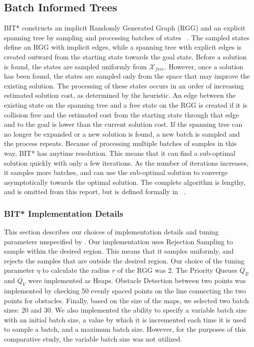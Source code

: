 \documentclass{article}
\begin{document}
\subsection{Batch Informed Trees}
BIT* constructs an implicit Randomly Generated Graph (RGG) and an explicit spanning tree by sampling and processing batches of states ~\cite{BIT*}. The sampled states define an RGG with implicit edges, while a spanning tree with explicit edges is created outward from the starting state towards the goal state. Before a solution is found, the states are sampled uniformly from $\mathcal{X}_{free}$. However, once a solution has been found, the states are sampled only from the space that may improve the existing solution. The processing of these states occurs in an order of increasing estimated solution cost, as determined by the heuristic. An edge between the existing state on the spanning tree and a free state on the RGG is created if it is collision free and the estimated cost from the starting state through that edge and to the goal is lower than the current solution cost. If the spanning tree can no longer be expanded or a new solution is found, a new batch is sampled and the process repeats. Because of processing multiple batches of samples in this way, BIT* has anytime resolution. This means that it can find a sub-optimal solution quickly with only a few iterations. As the number of iterations increases, it samples more batches, and can use the sub-optimal solution to converge asymptotically towards the optimal solution. The complete algorithm is lengthy, and is omitted from this report, but is defined formally in ~\cite{BIT*}.

\subsubsection{BIT* Implementation Details}
This section describes our choices of implementation details and tuning parameters unspecified by \citet{BIT*}. Our implementation uses Rejection Sampling to sample within the desired region. This means that it samples uniformly, and rejects the samples that are outside the desired region. Our choice of the tuning parameter $\mathcal{\eta}$ to calculate the radius $r$ of the RGG was 2. The Priority Queues $Q_E$ and $Q_V$ were implemented as Heaps. Obstacle Detection between two points was implemented by checking 50 evenly spaced points on the line connecting the two points for obstacles. Finally, based on the size of the maps, we selected two batch sizes: 20 and 30. We also implemented the ability to specify a variable batch size with an initial batch size, a value by which it is incremented each time it is used to sample a batch, and a maximum batch size. However, for the purposes of this comparative study, the variable batch size was not utilized.
\end{document}
